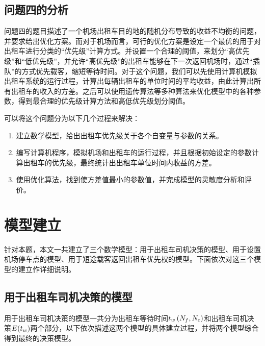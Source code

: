 \documentclass{cumcm}
\begin{document}
\subsection{问题四的分析}
问题四的题目描述了一个机场出租车目的地的随机分布导致的收益不均衡的问题，并要求给出优化方案。而对于机场而言，可行的优化方案是设定一个最优的用于对出租车进行分类的“优先级”计算方式。并设置一个合理的阈值，来划分“高优先级”和“低优先级”，并允许“高优先级”的出租车能够在下一次返回机场时，通过“插队”的方式优先载客，缩短等待时间。对于这个问题，我们可以先使用计算机模拟出租车系统的运行过程，计算出每辆出租车的单位时间的平均收益，由此计算出所有出租车的收入的方差。之后可以使用遗传算法等多种算法来优化模型中的各种参数，得到最合理的优先级计算方法和高低优先级划分阈值。
\par
可以将这个问题分为以下几个过程来解决：
\begin{enumerate}[(1)]
	\item 建立数学模型，给出出租车优先级关于各个自变量与参数的关系。
	\item 编写计算机程序，模拟机场和出租车的运行过程，并且根据初始设定的参数计算出租车的优先级，最终统计出出租车单位时间内收益的方差。
	\item 使用优化算法，找到使方差值最小的参数值，并完成模型的灵敏度分析和评价。
\end{enumerate}
\section{模型建立}
针对本题，本文一共建立了三个数学模型：用于出租车司机决策的模型、用于设置机场停车点的模型、用于短途载客返回出租车优先权的模型。下面依次对这三个模型的建立作详细说明。
\subsection{用于出租车司机决策的模型}
用于出租车司机决策的模型一共分为出租车等待时间$\mbox{$t_w$}\left(\mbox{$N_f$},\mbox{$N_c$}\right)$和出租车司机决策$E(\mbox{$t_w$})$两个部分，以下依次描述这两个模型的具体建立过程，并将两个模型综合得到最终的决策模型。
\end{document}
